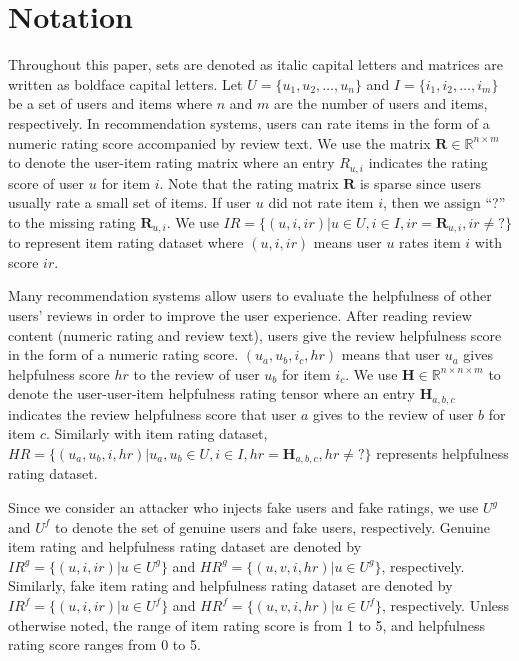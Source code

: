 \documentclass[master,english,final]{kaist-ucs}
\begin{document}
\section{Notation}
Throughout this paper, sets are denoted as italic capital letters and matrices are written as boldface capital letters.
Let $U = \{u_1,u_2,…,u_n\}$ and $I = \{i_1,i_2,…,i_m\}$  be a set of users and items where $n$ and $m$ are the number of users and items, respectively.
In recommendation systems, users can rate items in the form of a numeric rating score accompanied by review text.
We use the matrix $ \bm{R} \in \mathbb{R}^{n \times m} $ to denote the user-item rating matrix where an entry $ R_{u,i} $ indicates the rating score of user $u$ for item $i$.
Note that the rating matrix $\bm{R}$ is sparse since users usually rate a small set of items.
If user $u$ did not rate item $i$, then we assign “?” to the missing rating $\bm{R}_{u,i}$.
We use $IR=\{(u,i,ir)| u \in U,i \in I,ir=\bm{R}_{u,i},ir \neq ? \}$ to represent item rating dataset where $(u,i,ir)$ means user $u$ rates item $i$ with score $ir$.

Many recommendation systems allow users to evaluate the helpfulness of other users’ reviews in order to improve the user experience.
After reading review content (numeric rating and review text), users give the review helpfulness score in the form of a numeric rating score.
$(u_a,u_b,i_c,hr)$ means that user $u_a$ gives helpfulness score $hr$ to the review of user $u_b$ for item $i_c$.
We use $\bm{H} \in \mathbb{R}^{n \times n \times m}$ to denote the user-user-item helpfulness rating tensor where an entry $\bm{H}_{a,b,c}$ indicates the review helpfulness score that user $a$ gives to the review of user $b$ for item $c$.
Similarly with item rating dataset, $HR=\{(u_a,u_b,i,hr)| u_a,u_b \in U,i \in I,hr=\bm{H}_{a,b,c},hr \neq ?\}$ represents helpfulness rating dataset.

Since we consider an attacker who injects fake users and fake ratings, we use $U^g$ and $U^f$ to denote the set of genuine users and fake users, respectively.
Genuine item rating and helpfulness rating dataset are denoted by $IR^g=\{(u,i,ir)|u \in U^g\}$ and $HR^g=\{(u,v,i,hr)|u \in U^g\}$, respectively.
Similarly, fake item rating and helpfulness rating dataset are denoted by $IR^f=\{(u,i,ir)|u \in U^f\}$ and $HR^f=\{(u,v,i,hr)|u \in U^f\}$, respectively.
Unless otherwise noted, the range of item rating score is from 1 to 5, and helpfulness rating score ranges from 0 to 5.
\end{document}

